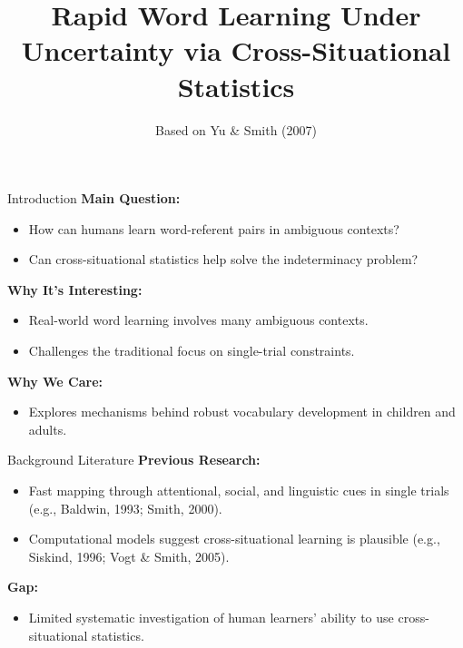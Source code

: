 \documentclass{beamer}
\title{Rapid Word Learning Under Uncertainty via Cross-Situational Statistics}
\author{Based on Yu \& Smith (2007)}
\date{}
\begin{document}
	
	\begin{frame}
		\titlepage
	\end{frame}
	
	\begin{frame}{Introduction}
		\textbf{Main Question:}
		\begin{itemize}
			\item How can humans learn word-referent pairs in ambiguous contexts?
			\item Can cross-situational statistics help solve the indeterminacy problem?
		\end{itemize}
		\vspace{0.3cm}
		\textbf{Why It's Interesting:}
		\begin{itemize}
			\item Real-world word learning involves many ambiguous contexts.
			\item Challenges the traditional focus on single-trial constraints.
		\end{itemize}
		\vspace{0.3cm}
		\textbf{Why We Care:}
		\begin{itemize}
			\item Explores mechanisms behind robust vocabulary development in children and adults.
		\end{itemize}
	\end{frame}
	
	\begin{frame}{Background Literature}
		\textbf{Previous Research:}
		\begin{itemize}
			\item Fast mapping through attentional, social, and linguistic cues in single trials (e.g., Baldwin, 1993; Smith, 2000).
			\item Computational models suggest cross-situational learning is plausible (e.g., Siskind, 1996; Vogt \& Smith, 2005).
		\end{itemize}
		\vspace{0.3cm}
		\textbf{Gap:}
		\begin{itemize}
			\item Limited systematic investigation of human learners' ability to use cross-situational statistics.
		\end{itemize}
	\end{frame}
	
\end{document}
